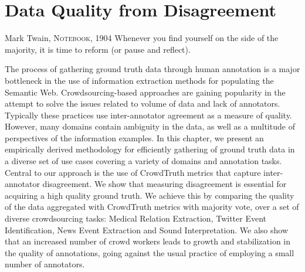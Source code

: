 \chapter{Data Quality from Disagreement}
\label{chap:maj-vote}

\begin{chapquote}{Mark Twain, \textsc{Notebook, 1904}}
Whenever you find yourself on the side of the majority, it is time to reform (or pause and reflect).
\end{chapquote}


The process of gathering ground truth data through human annotation is a major bottleneck in the use of information extraction methods for populating the Semantic Web. Crowdsourcing-based approaches are gaining popularity in the attempt to solve the issues related to volume of data and lack of annotators. Typically these practices use inter-annotator agreement as a measure of quality. However, many domains contain ambiguity in the data, as well as a multitude of perspectives of the information examples. In this chapter, we present an empirically derived methodology for efficiently gathering of ground truth data in a diverse set of use cases covering a variety of domains and annotation tasks. Central to our approach is the use of CrowdTruth metrics that capture inter-annotator disagreement. We show that measuring disagreement is essential for acquiring a high quality ground truth. We achieve this by comparing the quality of the data aggregated with CrowdTruth metrics with majority vote, over a set of diverse crowdsourcing tasks: Medical Relation Extraction, Twitter Event Identification, News Event Extraction and Sound Interpretation. We also show that an increased number of crowd workers leads to growth and stabilization in the quality of annotations, going against the usual practice of employing a small number of annotators.


